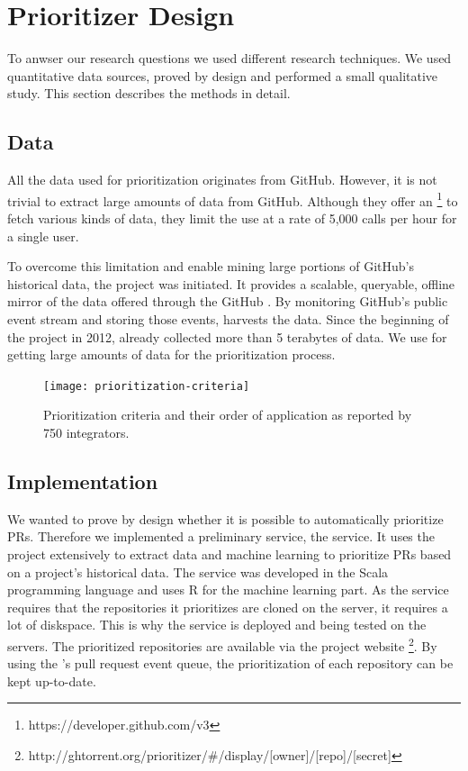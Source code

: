 \documentclass[conference]{IEEEtran}
\begin{document}
\section{Prioritizer Design}
\label{sec:design}

To anwser our research questions we used different research techniques.
We used quantitative data sources, proved by design and performed a small qualitative study.
This section describes the methods in detail.

\subsection{Data}
All the data used for prioritization originates from GitHub.
However, it is not trivial to extract large amounts of data from GitHub.
Although they offer an \api\footnote{https://developer.github.com/v3} to fetch various kinds of data, they limit the use at a rate of 5,000 \api calls per hour for a single user.

To overcome this limitation and enable mining large portions of GitHub's historical data, the \ghtorrent project \cite{Gousi13} was initiated.
It provides a scalable, queryable, offline mirror of the data offered through the GitHub \api.
By monitoring GitHub's public event stream and storing those events, \ghtorrent harvests the data.
Since the beginning of the project in 2012, \ghtorrent already collected more than 5 terabytes of data.
We use \ghtorrent for getting large amounts of data for the prioritization process.

\begin{figure}[t]
  \begin{center}
    \texttt{[image: prioritization-criteria]}
  \end{center}
  \caption{Prioritization criteria and their order of application as reported by
  750 integrators.}
  \label{fig:prioritization}
\end{figure}


\subsection{Implementation}
We wanted to prove by design whether it is possible to automatically prioritize PRs.
Therefore we implemented a preliminary service, the \prioritizer service.
It uses the \ghtorrent project extensively to extract data and machine learning to prioritize PRs based on a project's historical data.
The service was developed in the Scala programming language and uses R for the machine learning part.
As the service requires that the repositories it prioritizes are cloned on the server, it requires a lot of diskspace.
This is why the service is deployed and being tested on the \ghtorrent servers.
The prioritized repositories are available via the \ghtorrent project website \footnote{http://ghtorrent.org/prioritizer/\#/display/[owner]/[repo]/[secret]}.
By using the \ghtorrent's pull request event queue, the prioritization of each repository can be kept up-to-date.
\end{document}

